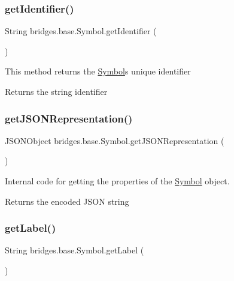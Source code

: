\subsubsection{\texorpdfstring{get\+Identifier()}{getIdentifier()}}
{\footnotesize\ttfamily String bridges.\+base.\+Symbol.\+get\+Identifier (\begin{DoxyParamCaption}{ }\end{DoxyParamCaption})}

This method returns the \hyperlink{classbridges_1_1base_1_1_symbol}{Symbol}\textquotesingle{}s unique identifier \begin{DoxyReturn}{Returns}
the string identifier 
\end{DoxyReturn}
\mbox{\label{classbridges_1_1base_1_1_symbol_aeba4cfa5b39fe03e72a568a8b7452e60}} 
\subsubsection{\texorpdfstring{get\+J\+S\+O\+N\+Representation()}{getJSONRepresentation()}}
{\footnotesize\ttfamily J\+S\+O\+N\+Object bridges.\+base.\+Symbol.\+get\+J\+S\+O\+N\+Representation (\begin{DoxyParamCaption}{ }\end{DoxyParamCaption})}

Internal code for getting the properties of the \hyperlink{classbridges_1_1base_1_1_symbol}{Symbol} object. \begin{DoxyReturn}{Returns}
the encoded J\+S\+ON string 
\end{DoxyReturn}
\mbox{\label{classbridges_1_1base_1_1_symbol_a7616c25b288a6e464f4f0b5fe4bd2826}} 
\subsubsection{\texorpdfstring{get\+Label()}{getLabel()}}
{\footnotesize\ttfamily String bridges.\+base.\+Symbol.\+get\+Label (\begin{DoxyParamCaption}{ }\end{DoxyParamCaption})}

